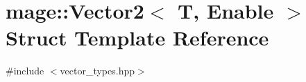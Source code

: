 \hypertarget{structmage_1_1_vector2}{}\section{mage\+:\+:Vector2$<$ T, Enable $>$ Struct Template Reference}
\label{structmage_1_1_vector2}


{\ttfamily \#include $<$vector\+\_\+types.\+hpp$>$}

